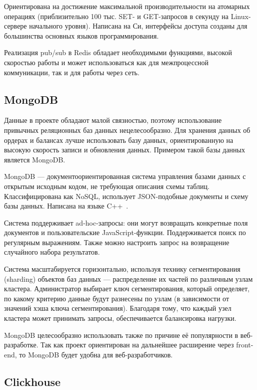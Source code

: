 Ориентирована на достижение максимальной производительности на атомарных операциях (приблизительно 100 тыс. SET- и GET-запросов в секунду на Linux-сервере начального уровня). Написана на Си, интерфейсы доступа созданы для большинства основных языков программирования.

Реализация pub/sub в Redis обладает необходимыми функциями, высокой скоростью работы и может использоваться как для межпроцессной коммуникации, так и для работы через сеть.

\subsection{MongoDB}

Данные в проекте обладают малой связностью, поэтому использование привычных реляционных баз данных нецелесообразно. Для хранения данных об ордерах и балансах лучше использовать базу данных, ориентированную на высокую скорость записи и обновления данных. Примером такой базы данных является MongoDB.

MongoDB — документоориентированная система управления базами данных с открытым исходным кодом, не требующая описания схемы таблиц. Классифицирована как NoSQL, использует JSON-подобные документы и схему базы данных. Написана на языке C++~\cite{mongo}.

Система поддерживает ad-hoc-запросы: они могут возвращать конкретные поля документов и пользовательские JavaScript-функции. Поддерживается поиск по регулярным выражениям. Также можно настроить запрос на возвращение случайного набора результатов.

Система масштабируется горизонтально, используя технику сегментирования (sharding) объектов баз данных — распределение их частей по различным узлам кластера. Администратор выбирает ключ сегментирования, который определяет, по какому критерию данные будут разнесены по узлам (в зависимости от значений хэша ключа сегментирования). Благодаря тому, что каждый узел кластера может принимать запросы, обеспечивается балансировка нагрузки.

MongoDB целесообразно использовать также по причине её популярности в веб-разработке. Так как проект ориентирован на дальнейшее расширение через front-end, то MongoDB будет удобна для веб-разработчиков.

\subsection{Clickhouse}

